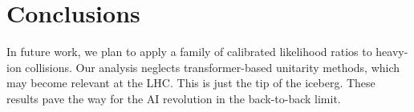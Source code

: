 \section{Conclusions}\label{sec:conclusions}

In future work, we plan to apply a family of calibrated likelihood
ratios to heavy-ion collisions. Our analysis neglects transformer-based
unitarity methods, which may become relevant at the LHC. This is just
the tip of the iceberg. These results pave the way for the AI revolution
in the back-to-back limit.

